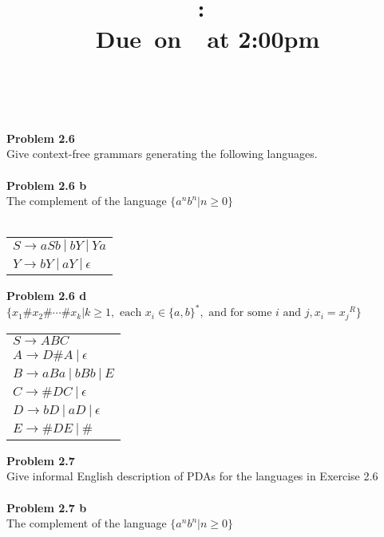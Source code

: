 \documentclass{article}
\title{
    \vspace{2in}
    \textmd{\textbf{\hmwkClass:\ \hmwkTitle}}\\
    \normalsize\vspace{0.1in}\small{Due\ on\ \hmwkDueDate\ at 2:00pm}\\
    \vspace{0.1in}\large{\textit{\hmwkClassInstructor\ \hmwkClassTime}}
    \vspace{3in}
}
\author{\textbf{\hmwkAuthorName}}
\date{}
\newcommand{\problem}[1]{\large{\textbf{Problem #1} \\}}
\begin{document}
\maketitle

\pagebreak

\problem{2.6}
Give context-free grammars generating the following languages. \\  \\
\problem{2.6 b}
The complement of the language $\{a^n b^n | n \geq 0\}$ \\ \\

\begin{table}[h!]
\centering
\begin{tabular}{l}
$S \rightarrow a S b\: | \:b Y \:|\: Y a $\\
$Y \rightarrow b Y \:| \:a Y \:| \:\epsilon$
\end{tabular}
\end{table}

\problem{2.6 d}
$\{x_1 \# x_2 \# \cdots \# x_k |  k \geq 1, \text{ each }x_i \in \{a,b\}^*,\text{ and for some } i \text{ and } j, x_i 
= {x_j}^R\}$

\begin{table}[h!]
\centering
\begin{tabular}{l}
$S \rightarrow A B C $\\
$A \rightarrow D \# A \:| \: \epsilon $\\
$B \rightarrow a B a \: | \: b B b \: | \: E $\\
$C \rightarrow \#DC \:| \: \epsilon $\\
$D \rightarrow bD \:| \: aD \: | \: \epsilon $\\
$E \rightarrow \#DE \:| \: \# $\\
\end{tabular}
\end{table}



\problem{2.7}
Give informal English description of PDAs for the languages in Exercise 2.6 \\ \\
\problem{2.7 b}
The complement of the language $\{a^n b^n | n \geq 0\}$ \\
\end{document}
